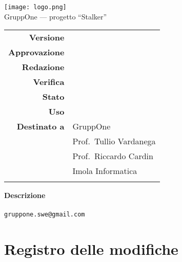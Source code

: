 \thispagestyle{empty}

\begin{center}

  \texttt{[image: logo.png]}\\
  {\Large GruppOne --- progetto ``Stalker''}\\
  \vspace{1.5cm}

  {\Huge \thetitle}
  \vspace{1.5cm}

  \begin{table}[H]
    \centering

    \begin{tabular}{r|l} %
      \textbf{Versione}                   & \versione{}             \\
      \textbf{Approvazione}               & \responsabile{}         \\
      \textbf{Redazione}                  & \redattori{}            \\
      \textbf{Verifica}                   & \verificatori{}         \\
      \textbf{Stato}                      & \stato{}                \\
      \textbf{Uso}                        & \uso{}                  \\
      \textbf{Destinato a}
                                          & GruppOne                \\
                                          & Prof.\ Tullio Vardanega \\
                                          & Prof.\ Riccardo Cardin  \\
      \ifthenelse{\equal{\uso}{Esterno}}{ & Imola Informatica       \\ }{}
    \end{tabular}
  \end{table}

  \vspace{3cm}
  \textbf{Descrizione}\\
  \descrizione{}\\
  \vfill
  \verb|gruppone.swe@gmail.com|
\end{center}

\newpage
\thispagestyle{nopage}

\section*{Registro delle modifiche}%
\label{sec:registro_delle_modifiche}

